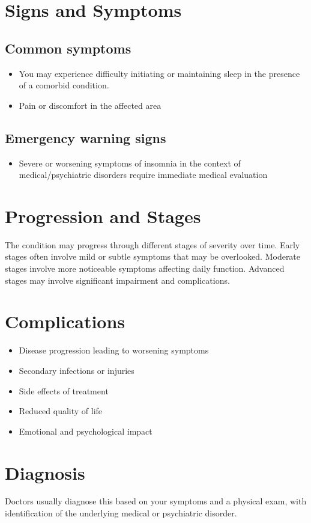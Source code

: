 \section{Signs and Symptoms}

\subsection{Common symptoms}
\begin{itemize}[noitemsep]
  \item You may experience difficulty initiating or maintaining sleep in the presence of a comorbid condition.

  \item Pain or discomfort in the affected area
  \end{itemize}

\subsection{Emergency warning signs}
\begin{itemize}[noitemsep]
  \item Severe or worsening symptoms of insomnia in the context of medical/psychiatric disorders require immediate medical evaluation
\end{itemize}
\section{Progression and Stages}
The condition may progress through different stages of severity over time. Early stages often involve mild or subtle symptoms that may be overlooked. Moderate stages involve more noticeable symptoms affecting daily function. Advanced stages may involve significant impairment and complications.
\section{Complications}
\begin{itemize}[noitemsep]
  \item Disease progression leading to worsening symptoms
  \item Secondary infections or injuries
  \item Side effects of treatment
  \item Reduced quality of life
  \item Emotional and psychological impact
\end{itemize}
\section{Diagnosis}
Doctors usually diagnose this based on your symptoms and a physical exam, with identification of the underlying medical or psychiatric disorder.

